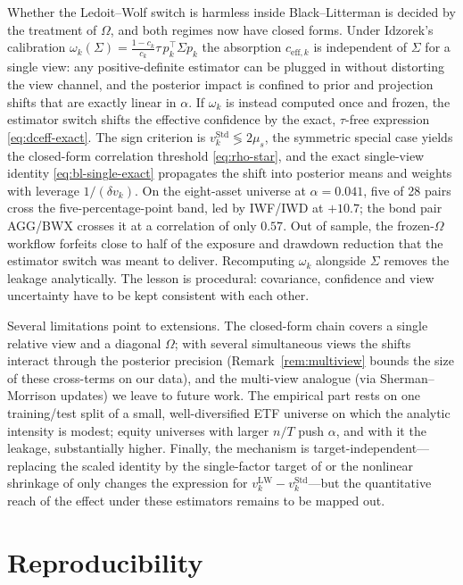 \documentclass[a4paper,11pt]{article}
\theoremstyle{plain}
\theoremstyle{definition}
\newcommand{\Std}{\mathrm{Std}}
\newcommand{\LW}{\mathrm{LW}}
\newcommand{\eff}{\mathrm{eff}}
\begin{document}
Whether the Ledoit--Wolf switch is harmless inside Black--Litterman is
decided by the treatment of $\Omega$, and both regimes now have closed
forms. Under Idzorek's calibration
$\omega_k(\Sigma) = \tfrac{1-c_k}{c_k}\tau\,p_k^\top\Sigma p_k$ the
absorption $c_{\eff,k}$ is independent of $\Sigma$ for a single view:
any positive-definite estimator can be plugged in without distorting the
view channel, and the posterior impact is confined to prior and
projection shifts that are exactly linear in $\alpha$. If
$\omega_k$ is instead computed once and frozen, the estimator switch
shifts the effective confidence by the exact, $\tau$-free expression
\eqref{eq:dceff-exact}. The sign criterion is
$v_k^\Std \lessgtr 2\mu_s$, the symmetric special case yields the
closed-form correlation threshold \eqref{eq:rho-star}, and the exact
single-view identity \eqref{eq:bl-single-exact} propagates the shift
into posterior means and weights with leverage $1/(\delta v_k)$. On the
eight-asset universe at $\alpha = 0.041$, five of 28 pairs cross the
five-percentage-point band, led by IWF/IWD at $+10.7$; the bond pair
AGG/BWX crosses it at a correlation of only $0.57$. Out of sample, the
frozen-$\Omega$ workflow forfeits close to half of the exposure and
drawdown reduction that the estimator switch was meant to deliver.
Recomputing $\omega_k$ alongside $\Sigma$ removes the leakage
analytically. The lesson is procedural: covariance, confidence and view
uncertainty have to be kept consistent with each other.

Several limitations point to extensions. The closed-form chain covers a
single relative view and a diagonal $\Omega$; with several simultaneous
views the shifts interact through the posterior precision
(Remark~\ref{rem:multiview} bounds the size of these cross-terms on our
data), and the multi-view analogue (via Sherman--Morrison updates) we
leave to future work. The empirical part
rests on one training/test split of a small, well-diversified ETF
universe on which the analytic intensity is modest; equity universes
with larger $n/T$ push $\alpha$, and with it the leakage, substantially
higher. Finally, the mechanism is target-independent---replacing the
scaled identity by the single-factor target of \citet{LedoitWolf2003} or
the nonlinear shrinkage of \citet{LedoitWolf2017} only changes the
expression for $v_k^{\LW} - v_k^\Std$---but the quantitative reach of
the effect under these estimators remains to be mapped out.

\section*{Reproducibility}
\end{document}
